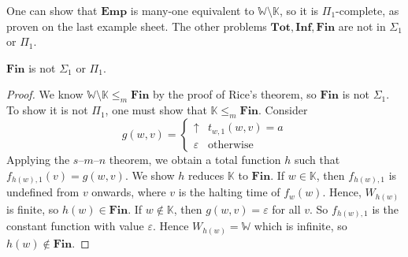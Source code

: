 \begin{remark}
	One can show that \( \mathbf{Emp} \) is many-one equivalent to \( \mathbb W \setminus \mathbb K \), so it is \( \Pi_1 \)-complete, as proven on the last example sheet.
	The other problems \( \mathbf{Tot}, \mathbf{Inf}, \mathbf{Fin} \) are not in \( \Sigma_1 \) or \( \Pi_1 \).
\end{remark}
\begin{theorem}
	\( \mathbf{Fin} \) is not \( \Sigma_1 \) or \( \Pi_1 \).
\end{theorem}
\begin{proof}
	We know \( \mathbb W \setminus \mathbb K \leq_m \mathbf{Fin} \) by the proof of Rice's theorem, so \( \mathbf{Fin} \) is not \( \Sigma_1 \).
	To show it is not \( \Pi_1 \), one must show that \( \mathbb K \leq_m \mathbf{Fin} \).
	Consider
	\[ g(w,v) = \begin{cases}
		\uparrow & t_{w,1}(w,v) = a \\
		\varepsilon & \text{otherwise}
	\end{cases} \]
	Applying the \( s \)--\( m \)--\( n \) theorem, we obtain a total function \( h \) such that \( f_{h(w),1}(v) = g(w,v) \).
	We show \( h \) reduces \( \mathbb K \) to \( \mathbf{Fin} \).
	If \( w \in \mathbb K \), then \( f_{h(w),1} \) is undefined from \( v \) onwards, where \( v \) is the halting time of \( f_w(w) \).
	Hence, \( W_{h(w)} \) is finite, so \( h(w) \in \mathbf{Fin} \).
	If \( w \not\in \mathbb K \), then \( g(w,v) = \varepsilon \) for all \( v \).
	So \( f_{h(w),1} \) is the constant function with value \( \varepsilon \).
	Hence \( W_{h(w)} = \mathbb W \) which is infinite, so \( h(w) \not\in \mathbf{Fin} \).
\end{proof}
